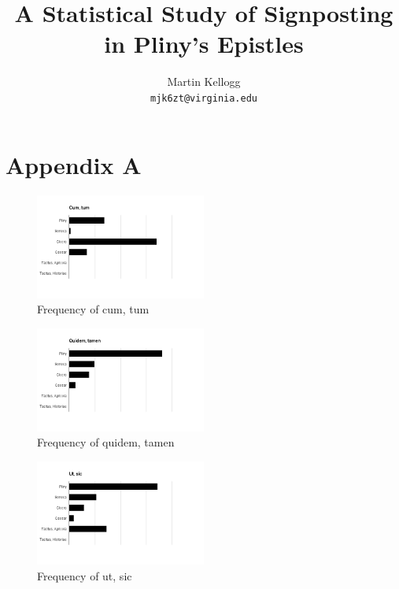 \documentclass[11pt,twocolumn]{article}
\begin{document}
\title{A Statistical Study of Signposting in Pliny's Epistles}

\author{
  Martin Kellogg\\
  \texttt{mjk6zt@virginia.edu}
}

\maketitle






\appendix
\section{Appendix A}

\begin{figure}
\includegraphics[width=0.5\textwidth]{cumtum.png}
\caption{\label{fig:gs}\label{fig:ct}Frequency of cum, tum}
\end{figure}

\begin{figure}
\includegraphics[width=0.5\textwidth]{quidemtamen.png}
\caption{\label{fig:qt}Frequency of quidem, tamen}
\end{figure}

\begin{figure}
\includegraphics[width=0.5\textwidth]{utsic.png}
\caption{\label{fig:us}Frequency of ut, sic}
\end{figure}
\end{document}
